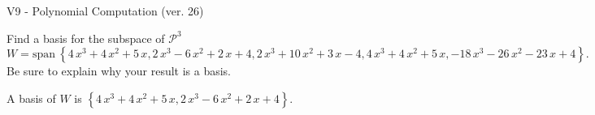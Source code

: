 \begin{exercise}
  \begin{exerciseTitle}V9 - Polynomial Computation (ver. 26)\end{exerciseTitle}
  \begin{exerciseStatement}
    Find a basis for the subspace of \(\mathcal{P}^3\) 
\[W=\mathrm{span}\ \left\{4 \, x^{3} + 4 \, x^{2} + 5 \, x , 2 \, x^{3} - 6 \, x^{2} + 2 \, x + 4 , 2 \, x^{3} + 10 \, x^{2} + 3 \, x - 4 , 4 \, x^{3} + 4 \, x^{2} + 5 \, x , -18 \, x^{3} - 26 \, x^{2} - 23 \, x + 4\right\}.\]
 Be sure to explain why your result is a basis.


  \end{exerciseStatement}
  \begin{exerciseAnswer}
   A basis of \(W\) is  \(\left\{4 \, x^{3} + 4 \, x^{2} + 5 \, x , 2 \, x^{3} - 6 \, x^{2} + 2 \, x + 4\right\}\).
  


  \end{exerciseAnswer}
\end{exercise}
